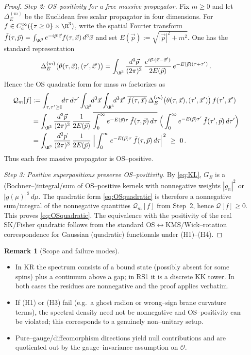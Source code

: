 \documentclass[10pt]{article}
\theoremstyle{definition}
\newtheorem{remark}{Remark}[section]
\theoremstyle{plain}
\begin{document}
\begin{proof}
\emph{Step 2: OS–positivity for a free massive propagator.}
Fix $m\ge 0$ and let $\Delta_E^{(m)}$ be the Euclidean free scalar propagator in four dimensions.
For $f\in C_c^\infty(\{\tau\ge 0\}\times\R^3)$, write the spatial Fourier transform
$\tilde f(\tau,\vec p)=\int_{\R^3} e^{-i\vec p\cdot \vec x}f(\tau,\vec x)\,d^3\vec x$ and set
$E(\vec p):=\sqrt{|\vec p|^2+m^2}$. One has the standard representation
\[
\Delta_E^{(m)}\big(\theta(\tau,\vec x),(\tau',\vec x')\big)
=\int_{\R^3}\frac{d^3\vec p}{(2\pi)^3}\,\frac{e^{i\vec p\cdot(\vec x-\vec x')}}{2E(\vec p)}
\,e^{-E(\vec p)(\tau+\tau')}\,.
\]
Hence the OS quadratic form for mass $m$ factorizes as
\begin{align*}
\mathcal Q_m[f]
&:=\int_{\tau,\tau'\ge 0}\!\! d\tau\,d\tau' \int_{\R^3}\!\! d^3\vec x \int_{\R^3}\!\! d^3\vec x'\;
\overline{f(\tau,\vec x)}\,\Delta_E^{(m)}\big(\theta(\tau,\vec x),(\tau',\vec x')\big)\,f(\tau',\vec x')\\
&=\int_{\R^3}\frac{d^3\vec p}{(2\pi)^3}\,\frac{1}{2E(\vec p)}\;
\overline{\int_{0}^{\infty} e^{-E(\vec p)\tau}\,\tilde f(\tau,\vec p)\,d\tau}\;
\Big(\int_{0}^{\infty} e^{-E(\vec p)\tau'}\,\tilde f(\tau',\vec p)\,d\tau'\Big)\\
&=\int_{\R^3}\frac{d^3\vec p}{(2\pi)^3}\,\frac{1}{2E(\vec p)}\;
\Big|\int_{0}^{\infty} e^{-E(\vec p)\tau}\,\tilde f(\tau,\vec p)\,d\tau\Big|^2\ \ge\ 0\,.
\end{align*}
Thus each free massive propagator is OS–positive.

\emph{Step 3: Positive superpositions preserve OS–positivity.}
By \eqref{eq:KL}, $G_E$ is a (Bochner–)integral/sum of OS–positive kernels with nonnegative weights
$|g_n|^2$ or $|g(\mu)|^2\,d\mu$. The quadratic form \eqref{eq:OSquadratic} is therefore a nonnegative
sum/integral of the nonnegative quantities $\mathcal Q_m[f]$ from Step~2, hence
$\mathcal Q[f]\ge 0$. This proves \eqref{eq:OSquadratic}. The equivalence with the positivity of the real
SK/Fisher quadratic follows from the standard OS$\leftrightarrow$KMS/Wick–rotation correspondence
for Gaussian (quadratic) functionals under \textnormal{(H1)}–\textnormal{(H4)}.
\end{proof}

\begin{remark}[Scope and failure modes]
\label{rem:uom-main-003}
\leavevmode
\begin{itemize}
\item In KR the spectrum consists of a bound state (possibly absent for some spins) plus a continuum
above a gap; in RS1 it is a discrete KK tower. In both cases the residues are nonnegative and the proof applies verbatim.
\item If \textnormal{(H1)} or \textnormal{(H3)} fail (e.g.\ a ghost radion or wrong–sign brane curvature terms),
the spectral density need not be nonnegative and OS–positivity can be violated; this corresponds to a genuinely
non–unitary setup.
\item Pure–gauge/diffeomorphism directions yield null contributions and are quotiented out by the
gauge–invariance assumption on $\mathcal O$.
\end{itemize}
\end{remark}
\end{document}

